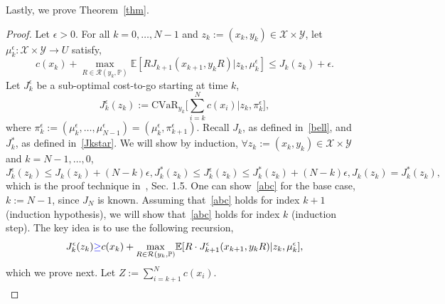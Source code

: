 \documentclass[letterpaper, 10 pt, conference]{ieeeconf}  %
\begin{document}
Lastly, we prove Theorem~\ref{thm}.\\
\begin{proof}
Let $\epsilon > 0$. For all $k = 0, \dots, N-1$ and $z_k := (x_k, y_k) \in \mathcal{X} \times \mathcal{Y}$, let $\mu_k^\epsilon : \mathcal{X} \times \mathcal{Y} \to U$ satisfy,
%
\begin{equation} 
c(x_k) + {\underset{R \in \mathcal{R}(y_k, \mathbb{P})}\max} \mathbb{E}[ RJ_{k+1}(x_{k+1}, y_k R) | z_k, \mu_k^\epsilon] \leq J_k(z_k) + \epsilon.
\label{first}\end{equation} 
%
Let $J_k^\epsilon$ be a sub-optimal cost-to-go starting at time $k$,
%
\begin{equation} 
J_k^\epsilon(z_k) := \text{CVaR}_{y_k}\big[\textstyle \sum_{i=k}^N c(x_i) \big| z_k, \pi_k^\epsilon \big],
\label{Jkeps}\end{equation}
%
where $\pi_k^\epsilon := (\mu_k^\epsilon,\dots,\mu_{N-1}^\epsilon) = (\mu_k^\epsilon, \pi_{k+1}^\epsilon)$. Recall $J_k$, as defined in~\eqref{bell}, and $J_k^*$, as defined in~\eqref{Jkstar}.
We will show by induction, $\forall z_k := (x_k, y_k) \in \mathcal{X} \times \mathcal{Y}$ and $k = N-1, \dots, 0$,
%
\begin{subequations}\label{abc}
\begin{equation}
J_k^\epsilon(z_k) \leq J_k(z_k) + (N-k)\epsilon, 
\label{a}\end{equation}
%
\begin{equation}
J_k^*(z_k) \leq J_k^\epsilon(z_k) \leq J_k^*(z_k) + (N-k)\epsilon, 
\label{b}\end{equation}
%
\begin{equation}
J_k(z_k) = J_k^*(z_k), 
\label{c}\end{equation}
\end{subequations}
%
which is the proof technique in~\cite{bertsekas2005dynamic}, Sec. 1.5. 
One can show~\eqref{abc} for the base case, $k := N-1$, since $J_N$ is known.
Assuming that~\eqref{abc} holds for index $k+1$ (induction hypothesis), we will show that~\eqref{abc} holds for index $k$ (induction step). The key 
idea is to use the following recursion,
%
\begin{equation}
J_k^\epsilon(z_k) \textcolor{blue}{\geq} c(x_k) + {\underset{R \in \mathcal{R}(y_k, \mathbb{P})}\max} \mathbb{E}[ R\cdot J^\epsilon_{k+1}(x_{k+1}, y_k R) | z_k, \mu_k^\epsilon],
\label{Jkepsrec}\end{equation}
%
which we prove next. Let $Z := \sum_{i=k+1}^N c(x_i)$. 
%
\begin{equation*}\begin{aligned}

\end{aligned}
\end{equation*}
\end{proof}
\end{document}
